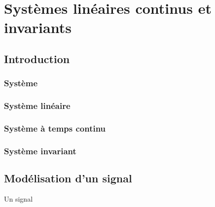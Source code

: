 \chapter[Systèmes linéaires, continus\ldots]{Systèmes linéaires continus et invariants\label{chap-SLCI}}
\adjustmtc
\minitoc
\newpage
\section{Introduction}


\subsection{Système}
\begin{center}
    
\end{center}

\subsection{Système linéaire}

\subsection{Système à temps continu}

\subsection{Système invariant}

\section{Modélisation d'un signal}
Un signal 


